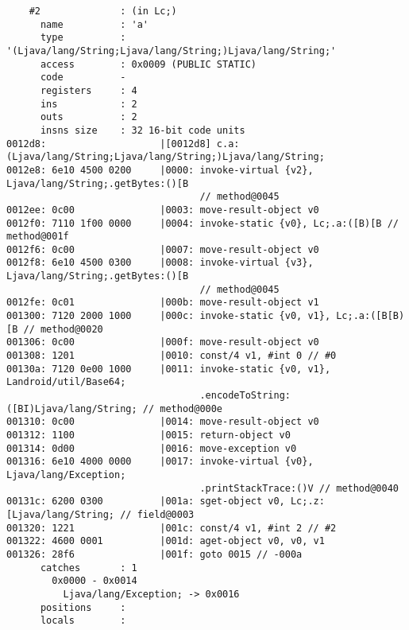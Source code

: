 \begin{lstlisting}
    #2              : (in Lc;)
      name          : 'a'
      type          : '(Ljava/lang/String;Ljava/lang/String;)Ljava/lang/String;'
      access        : 0x0009 (PUBLIC STATIC)
      code          -
      registers     : 4
      ins           : 2
      outs          : 2
      insns size    : 32 16-bit code units
0012d8:                    |[0012d8] c.a:(Ljava/lang/String;Ljava/lang/String;)Ljava/lang/String;
0012e8: 6e10 4500 0200     |0000: invoke-virtual {v2}, Ljava/lang/String;.getBytes:()[B
                                  // method@0045
0012ee: 0c00               |0003: move-result-object v0
0012f0: 7110 1f00 0000     |0004: invoke-static {v0}, Lc;.a:([B)[B // method@001f
0012f6: 0c00               |0007: move-result-object v0
0012f8: 6e10 4500 0300     |0008: invoke-virtual {v3}, Ljava/lang/String;.getBytes:()[B
                                  // method@0045
0012fe: 0c01               |000b: move-result-object v1
001300: 7120 2000 1000     |000c: invoke-static {v0, v1}, Lc;.a:([B[B)[B // method@0020
001306: 0c00               |000f: move-result-object v0
001308: 1201               |0010: const/4 v1, #int 0 // #0
00130a: 7120 0e00 1000     |0011: invoke-static {v0, v1}, Landroid/util/Base64;
                                  .encodeToString:([BI)Ljava/lang/String; // method@000e
001310: 0c00               |0014: move-result-object v0
001312: 1100               |0015: return-object v0
001314: 0d00               |0016: move-exception v0
001316: 6e10 4000 0000     |0017: invoke-virtual {v0}, Ljava/lang/Exception;
                                  .printStackTrace:()V // method@0040
00131c: 6200 0300          |001a: sget-object v0, Lc;.z:[Ljava/lang/String; // field@0003
001320: 1221               |001c: const/4 v1, #int 2 // #2
001322: 4600 0001          |001d: aget-object v0, v0, v1
001326: 28f6               |001f: goto 0015 // -000a
      catches       : 1
        0x0000 - 0x0014
          Ljava/lang/Exception; -> 0x0016
      positions     :
      locals        :


\end{lstlisting}
